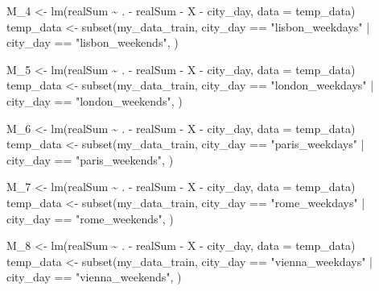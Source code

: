 \documentclass[
]{article}
\newenvironment{Shaded}{\begin{snugshade}}{\end{snugshade}}
\newcommand{\AttributeTok}[1]{\textcolor[rgb]{0.77,0.63,0.00}{#1}}
\newcommand{\FunctionTok}[1]{\textcolor[rgb]{0.00,0.00,0.00}{#1}}
\newcommand{\NormalTok}[1]{#1}
\newcommand{\OtherTok}[1]{\textcolor[rgb]{0.56,0.35,0.01}{#1}}
\newcommand{\SpecialCharTok}[1]{\textcolor[rgb]{0.00,0.00,0.00}{#1}}
\newcommand{\StringTok}[1]{\textcolor[rgb]{0.31,0.60,0.02}{#1}}
\begin{document}
\begin{Shaded}
\begin{Highlighting}[]
\NormalTok{M\_4 }\OtherTok{\textless{}{-}} \FunctionTok{lm}\NormalTok{(realSum }\SpecialCharTok{\textasciitilde{}}\NormalTok{ . }\SpecialCharTok{{-}}\NormalTok{ realSum }\SpecialCharTok{{-}}\NormalTok{ X }\SpecialCharTok{{-}}\NormalTok{ city\_day, }\AttributeTok{data =}\NormalTok{ temp\_data)}
\NormalTok{temp\_data }\OtherTok{\textless{}{-}} \FunctionTok{subset}\NormalTok{(my\_data\_train, city\_day }\SpecialCharTok{==} \StringTok{"lisbon\_weekdays"} \SpecialCharTok{|}
\NormalTok{    city\_day }\SpecialCharTok{==} \StringTok{"lisbon\_weekends"}\NormalTok{, )}

\NormalTok{M\_5 }\OtherTok{\textless{}{-}} \FunctionTok{lm}\NormalTok{(realSum }\SpecialCharTok{\textasciitilde{}}\NormalTok{ . }\SpecialCharTok{{-}}\NormalTok{ realSum }\SpecialCharTok{{-}}\NormalTok{ X }\SpecialCharTok{{-}}\NormalTok{ city\_day, }\AttributeTok{data =}\NormalTok{ temp\_data)}
\NormalTok{temp\_data }\OtherTok{\textless{}{-}} \FunctionTok{subset}\NormalTok{(my\_data\_train, city\_day }\SpecialCharTok{==} \StringTok{"london\_weekdays"} \SpecialCharTok{|}
\NormalTok{    city\_day }\SpecialCharTok{==} \StringTok{"london\_weekends"}\NormalTok{, )}

\NormalTok{M\_6 }\OtherTok{\textless{}{-}} \FunctionTok{lm}\NormalTok{(realSum }\SpecialCharTok{\textasciitilde{}}\NormalTok{ . }\SpecialCharTok{{-}}\NormalTok{ realSum }\SpecialCharTok{{-}}\NormalTok{ X }\SpecialCharTok{{-}}\NormalTok{ city\_day, }\AttributeTok{data =}\NormalTok{ temp\_data)}
\NormalTok{temp\_data }\OtherTok{\textless{}{-}} \FunctionTok{subset}\NormalTok{(my\_data\_train, city\_day }\SpecialCharTok{==} \StringTok{"paris\_weekdays"} \SpecialCharTok{|}
\NormalTok{    city\_day }\SpecialCharTok{==} \StringTok{"paris\_weekends"}\NormalTok{, )}

\NormalTok{M\_7 }\OtherTok{\textless{}{-}} \FunctionTok{lm}\NormalTok{(realSum }\SpecialCharTok{\textasciitilde{}}\NormalTok{ . }\SpecialCharTok{{-}}\NormalTok{ realSum }\SpecialCharTok{{-}}\NormalTok{ X }\SpecialCharTok{{-}}\NormalTok{ city\_day, }\AttributeTok{data =}\NormalTok{ temp\_data)}
\NormalTok{temp\_data }\OtherTok{\textless{}{-}} \FunctionTok{subset}\NormalTok{(my\_data\_train, city\_day }\SpecialCharTok{==} \StringTok{"rome\_weekdays"} \SpecialCharTok{|}
\NormalTok{    city\_day }\SpecialCharTok{==} \StringTok{"rome\_weekends"}\NormalTok{, )}

\NormalTok{M\_8 }\OtherTok{\textless{}{-}} \FunctionTok{lm}\NormalTok{(realSum }\SpecialCharTok{\textasciitilde{}}\NormalTok{ . }\SpecialCharTok{{-}}\NormalTok{ realSum }\SpecialCharTok{{-}}\NormalTok{ X }\SpecialCharTok{{-}}\NormalTok{ city\_day, }\AttributeTok{data =}\NormalTok{ temp\_data)}
\NormalTok{temp\_data }\OtherTok{\textless{}{-}} \FunctionTok{subset}\NormalTok{(my\_data\_train, city\_day }\SpecialCharTok{==} \StringTok{"vienna\_weekdays"} \SpecialCharTok{|}
\NormalTok{    city\_day }\SpecialCharTok{==} \StringTok{"vienna\_weekends"}\NormalTok{, )}


\end{Highlighting}
\end{Shaded}
\end{document}
